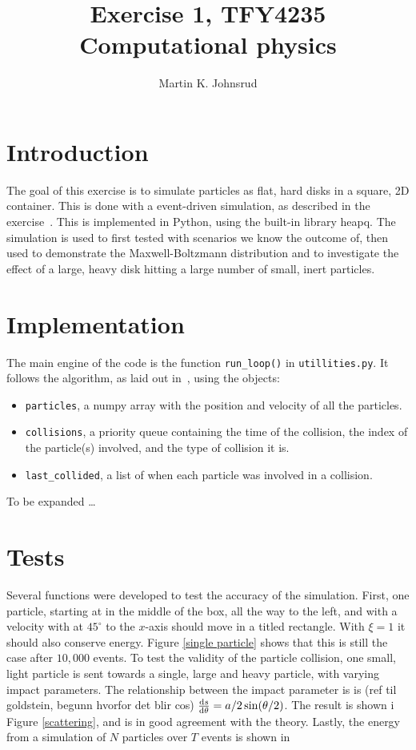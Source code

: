 \documentclass{article}
\title{Exercise 1, TFY4235 Computational physics}
\author{Martin K. Johnsrud}
\date{}
\begin{document}
    \maketitle
    \section*{Introduction}
        The goal of this exercise is to simulate particles as flat, hard disks in a square, 2D container. This is done with a event-driven simulation, as described in the exercise~\cite{exercise}. This is implemented in Python, using the built-in library heapq. The simulation is used to first tested with scenarios we know the outcome of, then used to demonstrate the Maxwell-Boltzmann distribution and to investigate the effect of a large, heavy disk hitting a large number of small, inert particles.
    
    \section*{Implementation}
        The main engine of the code is the function \verb|run_loop()| in \verb|utillities.py|. It follows the algorithm, as laid out in~\cite{exercise}, using the objects:
        \begin{itemize}
            \item \verb|particles|, a numpy array with the position and velocity of all the particles.
            \item \verb|collisions|, a priority queue containing the time of the collision, the index of the particle(s) involved, and the type of collision it is.
            \item \verb|last_collided|, a list of when each particle was involved in a collision.
        \end{itemize}
        To be expanded \dots

    \section*{Tests}
        Several functions were developed to test the accuracy of the simulation. First, one particle, starting at in the middle of the box, all the way to the left, and with a velocity with at $45^\circ$ to the $x$-axis should move in a titled rectangle. With $\xi=1$ it should also conserve energy. Figure \ref{single particle} shows that this is still the case after $10,000$ events. To test the validity of the particle collision, one small, light particle is sent towards a single, large and heavy particle, with varying impact parameters. The relationship between the impact parameter is is (ref til goldstein, begunn hvorfor det blir cos) $\dv{s}{\theta} = a / 2 \sin(\theta / 2)$. The result is shown i Figure \ref{scattering}, and is in good agreement with the theory. Lastly, the energy from a simulation of $N$ particles over $T$ events is shown in
\end{document}
